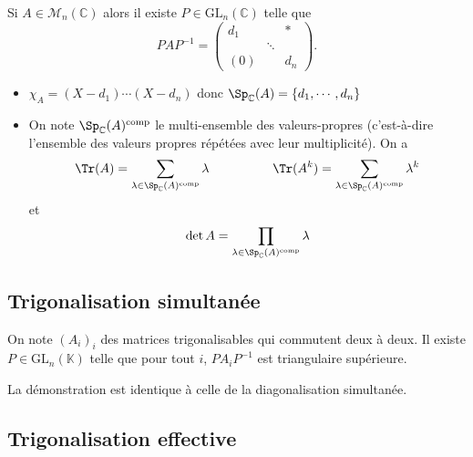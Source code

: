 \begin{rem}
    Si $A\in\mathcal M_n(\mathbb C)$ alors il existe $P\in\mathrm{GL}_n(\mathbb C)$ telle que \[
        PAP^{-1}= \begin{pmatrix}
            d_1 & & *\\
                &\ddots &\\
            (0)&&d_n
        \end{pmatrix}.
    \]
    \begin{itemize}
        \item $\chi_A=(X-d_1)\cdots (X-d_n)$ donc $\Sp_{\mathbb C}(A)=\{d_1, \cdots, d_n\}$
        \item On note $\Sp_{\mathbb C}(A)^{\text{comp}}$ le multi-ensemble des valeurs-propres (c'est-à-dire l'ensemble des valeurs propres répétées avec leur multiplicité). On a \[
                \Tr(A)=\sum_{\lambda\in\Sp_{\mathbb C}(A)^{\text{comp}}}\lambda\qquad \qquad \quad \Tr(A^k)=\sum_{\lambda\in\Sp_{\mathbb C}(A)^{\text{comp}}}\lambda^k
            \]
            et \[
                \det A=\prod_{\lambda\in\Sp_{\mathbb C}(A)^{\text{comp}}}\lambda
            \]
    \end{itemize}
\end{rem}

\subsection{Trigonalisation simultanée}

On note $(A_i)_i$ des matrices trigonalisables qui commutent deux à deux. Il existe $P\in\mathrm{GL}_n(\mathbb K)$ telle que pour tout $i$, $PA_iP^{-1}$ est triangulaire supérieure.

La démonstration est identique à celle de la diagonalisation simultanée.

\subsection{Trigonalisation effective}

